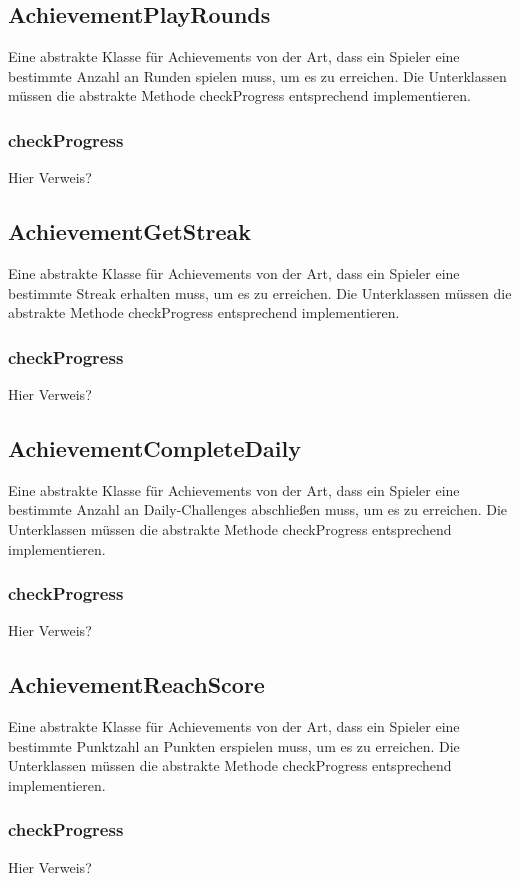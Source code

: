 \documentclass[a4paper]{scrreprt}
\begin{document}
	\subsection{AchievementPlayRounds}
	Eine abstrakte Klasse für Achievements von der Art, dass ein Spieler eine bestimmte Anzahl an Runden spielen muss, um es zu erreichen. Die Unterklassen müssen die abstrakte Methode checkProgress entsprechend implementieren.
	\subsubsection{checkProgress}
	Hier Verweis?

	\subsection{AchievementGetStreak}
	Eine abstrakte Klasse für Achievements von der Art, dass ein Spieler eine bestimmte Streak erhalten muss, um es zu erreichen. Die Unterklassen müssen die abstrakte Methode checkProgress entsprechend implementieren.
	\subsubsection{checkProgress}
	Hier Verweis?

	\subsection{AchievementCompleteDaily}
	Eine abstrakte Klasse für Achievements von der Art, dass ein Spieler eine bestimmte Anzahl an Daily-Challenges abschließen muss, um es zu erreichen. Die Unterklassen müssen die abstrakte Methode checkProgress entsprechend implementieren.
	\subsubsection{checkProgress}
	Hier Verweis?

	\subsection{AchievementReachScore}
	Eine abstrakte Klasse für Achievements von der Art, dass ein Spieler eine bestimmte Punktzahl an Punkten erspielen muss, um es zu erreichen. Die Unterklassen müssen die abstrakte Methode checkProgress entsprechend implementieren.
	\subsubsection{checkProgress}
	Hier Verweis?
\end{document}
